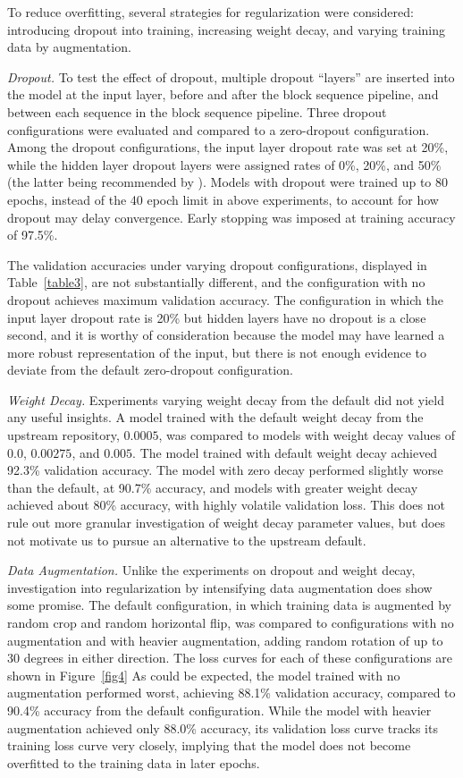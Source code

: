 \documentclass[letterpaper]{article} %
\begin{document}
To reduce overfitting, several strategies for regularization were considered:
introducing dropout into training, increasing weight decay, and varying training data by augmentation.

\textit{Dropout.}
To test the effect of dropout, multiple dropout ``layers'' are inserted into the model at the input layer,
before and after the block sequence pipeline, and between each sequence in the block sequence pipeline.
Three dropout configurations were evaluated and compared to a zero-dropout configuration.
Among the dropout configurations, the input layer dropout rate was set at 20\%, while the hidden layer
dropout layers were assigned rates of 0\%, 20\%, and 50\% (the latter being recommended by \cite{JMLR:v15:srivastava14a}).
Models with dropout were trained up to 80 epochs, instead of the 40 epoch limit in above experiments,
to account for how dropout may delay convergence.
Early stopping was imposed at training accuracy of 97.5\%.

The validation accuracies under varying dropout configurations, displayed in Table~\ref{table3},
are not substantially different, and the configuration with no dropout achieves maximum validation accuracy.
The configuration in which the input layer dropout rate is 20\% but hidden layers have no dropout
is a close second, and it is worthy of consideration because the model may have learned a more robust
representation of the input, but there is not enough evidence to deviate from the default zero-dropout
configuration.

\textit{Weight Decay.} Experiments varying weight decay from the default did not yield any useful insights.
A model trained with the default weight decay from the upstream repository, $0.0005 $,
was compared to models with weight decay values of $ 0.0 $, $ 0.00275 $, and $ 0.005 $.
The model trained with default weight decay achieved 92.3\% validation accuracy.
The model with zero decay performed slightly worse than the default, at 90.7\% accuracy, and
models with greater weight decay achieved about 80\% accuracy, with highly volatile validation
loss.
This does not rule out more granular investigation of weight decay parameter values, but does not
motivate us to pursue an alternative to the upstream default.

\textit{Data Augmentation.} Unlike the experiments on dropout and weight decay, investigation into regularization by
intensifying data augmentation does show some promise.
The default configuration, in which training data is augmented by random crop and random horizontal flip,
was compared to configurations with no augmentation and with heavier augmentation,
adding random rotation of up to 30 degrees in either direction.
The loss curves for each of these configurations are shown in Figure~\ref{fig4}
As could be expected, the model trained with no augmentation performed worst,
achieving 88.1\% validation accuracy, compared to 90.4\% accuracy from the default configuration.
While the model with heavier augmentation achieved only 88.0\% accuracy, its
validation loss curve tracks its training loss curve very closely, implying that
the model does not become overfitted to the training data in later epochs.
\end{document}
